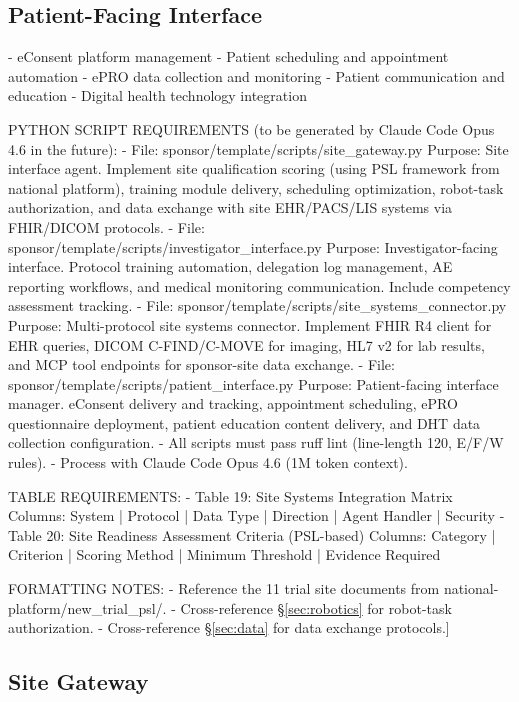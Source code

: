 \subsection{Patient-Facing Interface}
- eConsent platform management
- Patient scheduling and appointment automation
- ePRO data collection and monitoring
- Patient communication and education
- Digital health technology integration

PYTHON SCRIPT REQUIREMENTS (to be generated by Claude Code Opus 4.6 in the future):
- File: sponsor/template/scripts/site\_gateway.py
  Purpose: Site interface agent. Implement site qualification scoring
  (using PSL framework from national platform), training module delivery,
  scheduling optimization, robot-task authorization, and data exchange
  with site EHR/PACS/LIS systems via FHIR/DICOM protocols.
- File: sponsor/template/scripts/investigator\_interface.py
  Purpose: Investigator-facing interface. Protocol training automation,
  delegation log management, AE reporting workflows, and medical
  monitoring communication. Include competency assessment tracking.
- File: sponsor/template/scripts/site\_systems\_connector.py
  Purpose: Multi-protocol site systems connector. Implement FHIR R4 client
  for EHR queries, DICOM C-FIND/C-MOVE for imaging, HL7 v2 for lab results,
  and MCP tool endpoints for sponsor-site data exchange.
- File: sponsor/template/scripts/patient\_interface.py
  Purpose: Patient-facing interface manager. eConsent delivery and tracking,
  appointment scheduling, ePRO questionnaire deployment, patient education
  content delivery, and DHT data collection configuration.
- All scripts must pass ruff lint (line-length 120, E/F/W rules).
- Process with Claude Code Opus 4.6 (1M token context).

TABLE REQUIREMENTS:
- Table 19: Site Systems Integration Matrix
  Columns: System | Protocol | Data Type | Direction | Agent Handler | Security
- Table 20: Site Readiness Assessment Criteria (PSL-based)
  Columns: Category | Criterion | Scoring Method | Minimum Threshold | Evidence Required

FORMATTING NOTES:
- Reference the 11 trial site documents from national-platform/new\_trial\_psl/.
- Cross-reference \S\ref{sec:robotics} for robot-task authorization.
- Cross-reference \S\ref{sec:data} for data exchange protocols.]

\subsection{Site Gateway}


